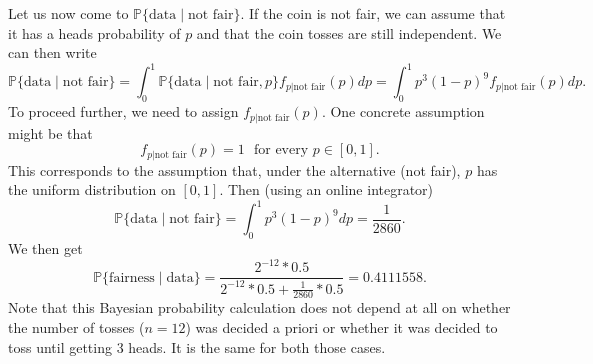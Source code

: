 \documentclass{scrartcl}
\renewcommand{\P}{{\mathbb P}}
\begin{document}
Let us now come to $\P\{\text{data} \mid \text{not fair}\}$. If the
coin is not fair, we can assume that it has a heads probability of $p$
and that the coin tosses are still independent. We can then write
\begin{equation*}
  \P\{\text{data} \mid \text{not fair}\} = \int_0^1 \P\{\text{data} \mid
  \text{not fair}, p\} f_{p|\text{not fair}}(p) dp = \int_0^1 p^3 (1 -
  p)^9   f_{p|\text{not fair}}(p) dp. 
\end{equation*}
To proceed further, we need to assign $f_{p|\text{not fair}}(p)$. One
concrete assumption might be that
\begin{equation}\label{altmod}
f_{p|\text{not fair}}(p) = 1 ~~~\text{for every $p \in [0, 1]$}.   
\end{equation}
This corresponds to the assumption that, under
the alternative (not fair), $p$ has the uniform distribution on $[0,
1]$. Then (using an online integrator)
\begin{equation*}
  \P\{\text{data} \mid \text{not fair}\} = \int_0^1 p^3 (1 -
  p)^9  dp = \frac{1}{2860}. 
\end{equation*}
We then get
\begin{equation*}
  \P\{\text{fairness} \mid \text{data}\} = \frac{2^{-12} *
    0.5}{2^{-12}*0.5 + \frac{1}{2860} * 0.5} = 0.4111558. 
\end{equation*}
Note that this Bayesian probability calculation does not depend at all
on whether the number of tosses ($n = 12$) was decided a priori or
whether it was decided to toss until getting 3 heads. It is the same
for both those cases.
\end{document}
